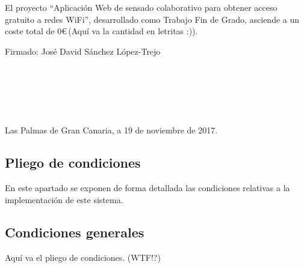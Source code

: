 El proyecto ``Aplicación Web de sensado colaborativo para obtener acceso gratuito a redes WiFi'', desarrollado como Trabajo Fin de Grado, asciende a un coste total de $0$\euro\,(Aquí va la cantidad en letritas :)).

\indent Firmado: José David Sánchez López-Trejo \\~ \\~ \\~ \\~ \\~
\begin{flushright}
Las Palmas de Gran Canaria, a 19 de noviembre de 2017.
\end{flushright}

\cleardoublepage
{}
\begin{center}
\begin{minipage}{.75\textwidth}
\section*{Pliego de condiciones}

En este apartado se exponen de forma detallada las condiciones relativas a la implementación de este sistema.
\end{minipage}
\end{center}
\clearpage
\subsection*{Condiciones generales}
Aquí va el pliego de condiciones. (WTF!?) \kosa